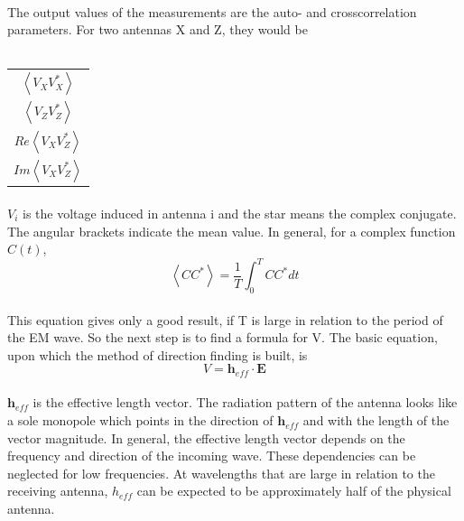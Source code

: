 \documentclass[a4paper,10pt]{thesis}
\begin{document}
\paragraph*{}
The output values of the measurements are the auto- and crosscorrelation parameters. For two antennas X and Z, they would be\\
\\
\begin{center}
\begin{tabular}{c}
$\left\langle V_X V_X^* \right\rangle $  \\
$\left\langle V_Z V_Z^* \right\rangle $  \\
$Re\left\langle V_X V_Z^* \right\rangle $  \\
$Im\left\langle V_X V_Z^* \right\rangle $  \\
\end{tabular}
\end{center}

\paragraph*{}
$V_i$ is the voltage induced in antenna i and the star means the complex conjugate. The angular brackets indicate the mean value. In general, for a complex function $C(t)$,
\begin{equation}
\left\langle CC^* \right\rangle = \frac{1}{T}\int_0^T CC^* dt
\end{equation}

\paragraph*{}
This equation gives only a good result, if T is large in relation to the period of the EM wave. So the next step is to find a formula for V. The basic equation, upon which the method of direction finding is built, is
\begin{equation}
V=\textbf{h}_{eff}\cdot \textbf{E}
\end{equation}
\paragraph*{}
$\textbf{h}_{eff}$ is the effective length vector. The radiation pattern of the antenna looks like a sole monopole which points in the direction of $\textbf{h}_{eff}$ and with the length of the vector magnitude. In general, the effective length vector depends on the frequency and direction of the incoming wave. These dependencies can be neglected for low frequencies. At wavelengths that are large in relation to the receiving antenna, $h_{eff}$ can be expected to be approximately half of the physical antenna.
\end{document}

